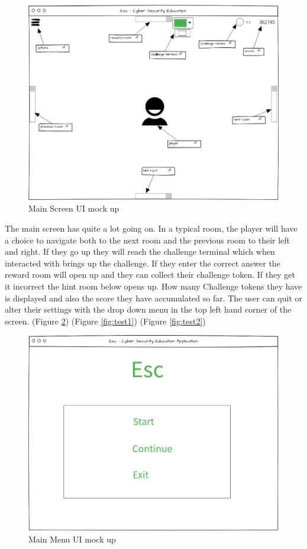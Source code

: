 \documentclass[12pt,a4paper]{article}
\begin{document}
\begin{figure}[h]
    \centering
    \includegraphics[width=1.0\textwidth]{Figs/Ui_main_screen.PNG} 
    \caption{Main Screen UI mock up} 
    \label{Mainscreen}
\end{figure}   

The main screen has quite a lot going on. In a typical room, the player will have a choice to navigate both to the next room and the previous room to their left and right. If they go up they will reach the challenge terminal which when interacted with brings up the challenge. If they enter the correct answer the reward room will open up and they can collect their challenge token. If they get it incorrect the hint room below opens up. How many Challenge tokens they have is displayed and also the score they have accumulated so far. The user can quit or alter their settings with the drop down menu in the top left hand corner of the screen. (Figure \ref{Mainmenu}) (Figure \ref{fig:test1}) (Figure \ref{fig:test2})

\begin{figure}[h]
    \centering
    \includegraphics[width=1.0\textwidth]{Figs/Ui_main_menu.PNG} 
    \caption{Main Menu UI mock up} 
    \label{Mainmenu}
\end{figure}   
\end{document}
